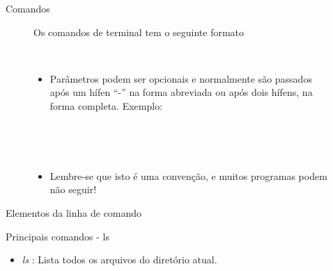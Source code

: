 \documentclass{beamer}
\begin{document}
\begin{frame}{Comandos}
    \begin{figure}[h]
        \centering
        Os comandos de terminal tem o seguinte formato \newline \\
        \begin{shell}
        \end{shell}
        \\
        \begin{itemize}
        \item Parâmetros podem ser opcionais e normalmente são passados após um hífen
          ``-'' na forma abreviada ou após dois hífens, na forma completa.
          Exemplo:
        \end{itemize}
        \begin{shell}
          \\
         \end{shell}
        \\
        \begin{itemize}
        \item{Lembre-se que isto é uma convenção, e muitos programas podem não
          seguir!}
        \end{itemize}
    \end{figure}
\end{frame}



\begin{frame}{Elementos da linha de comando}
    \begin{figure}[h]
        \centering
        \begin{shell}
        \end{shell}
    \end{figure}
\end{frame}

\begin{frame}{Principais comandos - ls}
   \begin{itemize}
   \item \emph{ls} : Lista todos os arquivos do diretório atual.
   \end{itemize}
   \begin{shell}
   \end{shell}
\end{frame}
\end{document}
